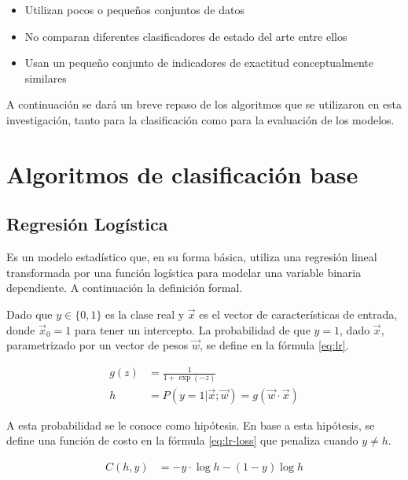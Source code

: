 \begin{itemize}
	\item Utilizan pocos o pequeños conjuntos de datos
	\item No comparan diferentes clasificadores de estado del arte entre ellos
	\item Usan un pequeño conjunto de indicadores de exactitud conceptualmente similares
\end{itemize}

A continuación se dará un breve repaso de los algoritmos que se utilizaron en esta investigación, tanto para la clasificación como para la evaluación de los modelos.

\section{Algoritmos de clasificación base}

\subsection{Regresión Logística}

Es un modelo estadístico que, en su forma básica, utiliza una regresión lineal transformada por una función logística para modelar una variable binaria dependiente. A continuación la definición formal.

Dado que $y\in \{0, 1\}$ es la clase real y $\vec{x}$ es el vector de características de entrada, donde $\vec{x}_0 = 1$ para tener un intercepto. La probabilidad de que $y=1$, dado $\vec{x}$, parametrizado por un vector de pesos $\vec{w}$,
se define en la fórmula \ref{eq:lr}.

\begin{equation}
	\label{eq:lr}
\begin{split}
	g(z) &= \frac{1}{1 + \exp(-z) } \\
	h &= P(y=1|\vec{x};\vec{w}) = g(\vec{w}\cdot\vec{x})
\end{split}
\end{equation}

A esta probabilidad se le conoce como hipótesis. En base a esta hipótesis, se define una función de costo en la fórmula \ref{eq:lr-loss} que penaliza cuando $y \ne h$.

\begin{equation}
	\label{eq:lr-loss}
\begin{split}
	C(h, y) &= -y \cdot \log{h} - (1-y) \log{h}
\end{split}
\end{equation}

